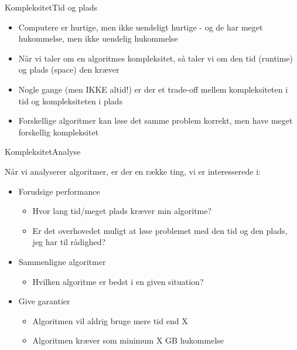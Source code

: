\documentclass{beamer}
\begin{document}
\begin{frame}{Kompleksitet}{Tid og plads}
    \begin{itemize}
        \item Computere er hurtige, men ikke uendeligt hurtige - og de har meget
            hukommelse, men ikke uendelig hukommelse
        \item Når vi taler om en algoritmes kompleksitet, så taler vi om den
            \alert{tid} (runtime) og \alert{plads} (space) den kræver
        \item Nogle gange (men IKKE altid!) er der et \alert{trade-off mellem
            kompleksiteten i tid og kompleksiteten i plads}
        \item Forskellige algoritmer kan løse det samme problem korrekt, men
            have meget forskellig kompleksitet
    \end{itemize}
\end{frame}

\begin{frame}{Kompleksitet}{Analyse}

        Når vi analyserer algoritmer, er der en række ting, vi er interesserede
        i:

        \pause
        \begin{itemize}
            \item Forudsige performance
                \begin{itemize}
                    \item Hvor lang tid/meget plads kræver min algoritme?
                    \item Er det overhovedet muligt at løse problemet med den
                        tid og den plads, jeg har til rådighed?
                \end{itemize}
                \pause
            \item Sammenligne algoritmer
                \begin{itemize}
                    \item Hvilken algoritme er bedst i en given situation?
                \end{itemize}
                \pause
            \item Give garantier
                \begin{itemize}
                    \item Algoritmen vil aldrig bruge \alert{mere} tid end X
                    \item Algoritmen kræver \alert{som minimum} X GB hukommelse
                \end{itemize}
        \end{itemize}
    
\end{frame}
\end{document}
